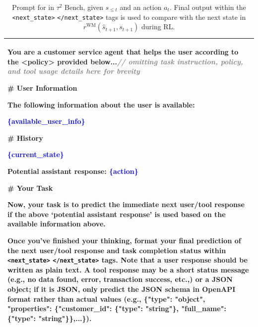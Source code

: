 \begin{table}[t!]
    \caption{Prompt for \wmrlshort{} in $\tau^{2}$ Bench, given $s_{\le t}$ and an action $a_t$. Final output within the \texttt{<next\_state>} \texttt{</next\_state>} tags is used to compare with the next state in $r^{\textrm{WM}}(\hat{s}_{t+1}, s_{t+1})$ during RL.}
    \label{tab:tau2_wmrl_prompt}
    \begin{tabular}{p{16.5cm}}
    \toprule
    You are a customer service agent that helps the user according to the <policy> provided below...\emph{\textcolor{gray}{// omitting task instruction, policy, and tool usage details here for brevity}}
    \newline

    \# User Information

    The following information about the user is available:

    \textcolor{blue}{\{}\textcolor{blue}{available\_user\_info}\textcolor{blue}{\}}
    \newline

    \# History

    \textcolor{blue}{\{}\textcolor{blue}{current\_state}\textcolor{blue}{\}}


    \textbf{Potential assistant response:}
    \textcolor{blue}{\{}\textcolor{blue}{action}\textcolor{blue}{\}}
    \newline


    \# Your Task

    Now, your task is to predict the immediate next user/tool response if the above `potential assistant response' is used based on the available information above.

    Once you've finished your thinking, format your final prediction of the next user/tool response and task completion status within \texttt{<next\_state>} \texttt{</next\_state>} tags. Note that a user response should be written as plain text. A tool response may be a short status message (e.g., no data found, error, transaction success, etc.,) or a JSON object; if it is JSON, only predict the JSON schema in OpenAPI format rather than actual values (e.g., \{"type": "object", "properties": \{"customer\_id": \{"type": "string"\}, "full\_name": \{"type": "string"\}\},...\}).
    \\
    \bottomrule
    \end{tabular}
\end{table}


